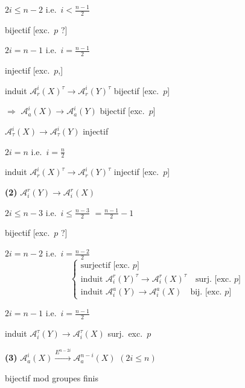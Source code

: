 \documentclass[11pt,a4paper]{article}
\begin{document}
$2i \leqslant n-2$ \quad i.e.\ $i < \frac{n-1}{2}$

\qquad bijectif [exc.\ $p$ ?]

$2i = n-1$ \quad i.e.\ $i = \frac{n-1}{2}$

\qquad injectif [exc.\ $p$,]

\qquad induit $\mathcal{A}^{i}_{r}(X)^{\tau} \longrightarrow
\mathcal{A}^{i}_{r}(Y)^{\tau}$ \quad bijectif [exc.\ $p$]

\qquad $\Longrightarrow$ \quad $\mathcal{A}^{i}_{a}(X) \longrightarrow
\mathcal{A}^{i}_{a}(Y)$ \quad bijectif [exc.\ $p$]

\qquad\qquad $\mathcal{A}^{i}_{\tau}(X) \longrightarrow
\mathcal{A}^{i}_{\tau}(Y)$ \quad injectif

$2i = n$ \quad i.e.\ $i = \frac{n}{2}$

\qquad induit $\mathcal{A}^{i}_{r}(X)^{\tau} \longrightarrow
\mathcal{A}^{i}_{r}(Y)^{\tau}$ \quad injectif [exc.\ $p$]

\textbf{(2)} \quad $\mathcal{A}^{r}_{i}(Y) \longrightarrow \mathcal{A}^{r}_{i}(X)$

$2i \leqslant n-3$ \quad i.e.\ $i \leqslant \frac{n-3}{2}$
\struck{\ill{}} $= \frac{n-1}{2} - 1$

\qquad bijectif [exc.\ $p$ ?]

$2i = n-2$ \quad i.e.\ $i = \frac{n-2}{2}$
\[
\begin{cases}
\text{surjectif [exc.\ } p\text{]} \\
\text{induit } \mathcal{A}^{r}_{i}(Y)^{\tau} \to \mathcal{A}^{r}_{i}(X)^{\tau}
\quad \text{surj.\ [exc.\ } p\text{]} \\
\text{induit } \mathcal{A}^{a}_{i}(Y) \to \mathcal{A}^{a}_{i}(X)
\quad \text{bij.\ [exc.\ } p\text{]}
\end{cases}
\]

$2i = n-1$ \quad i.e.\ $i = \frac{n-1}{2}$

\qquad induit $\mathcal{A}^{\tau}_{i}(Y) \longrightarrow
\mathcal{A}^{\tau}_{i}(X)$ \quad surj.\ exc.\ $p$

\textbf{(3)} \quad $\mathcal{A}^{i}_{a}(X) \xrightarrow{E^{n-2i}}
\mathcal{A}^{n-i}_{a}(X)$ \quad $(2i \leqslant n)$

\qquad {} bijectif mod groupes finis

\qquad {}
\end{document}
